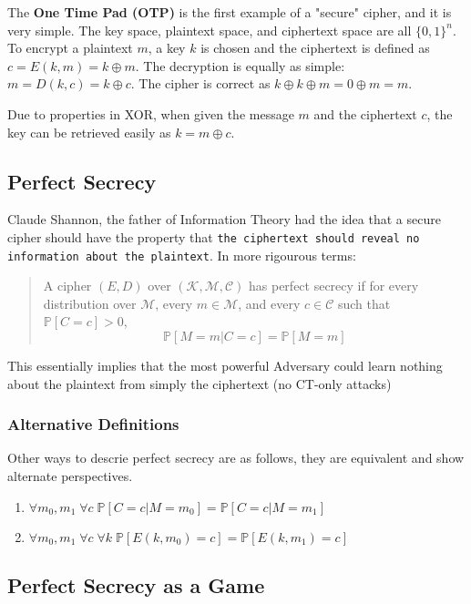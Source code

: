 \documentclass{article}
\begin{document}
\begin{multicols}{2}
The \textbf{One Time Pad (OTP)} is the first example of a "secure" cipher, and it is very simple. The key space, plaintext space, and ciphertext space are all $\{0,1\}^n$. To encrypt a plaintext $m$, a key $k$ is chosen and the ciphertext is defined as $c = E(k,m) = k \oplus m$. The decryption is equally as simple: $m = D(k,c) = k \oplus c$. The cipher is correct as $k \oplus k \oplus m = 0 \oplus m = m$.

Due to properties in XOR, when given the message $m$ and the ciphertext $c$, the key can be retrieved easily as $k = m \oplus c$.

\subsection{Perfect Secrecy}

Claude Shannon, the father of Information Theory had the idea that a secure cipher should have the property that \texttt{the ciphertext should reveal no information about the plaintext}. In more rigourous terms:
\begin{quote}
A cipher $(E,D)$ over $(\mathcal{K},\mathcal{M}, \mathcal{C})$ has perfect secrecy if for every distribution over $\mathcal{M}$, every $m \in \mathcal{M}$, and every $c \in \mathcal{C}$ such that $\mathbb{P}[C=c] >0$, 
$$
\mathbb{P}[M=m | C=c] = \mathbb{P}[M=m]
$$
\end{quote}

This essentially implies that the most powerful Adversary could learn nothing about the plaintext from simply the ciphertext (no CT-only attacks)

\subsubsection{Alternative Definitions}

Other ways to descrie perfect secrecy are as follows, they are equivalent and show alternate perspectives.

\begin{enumerate}
    \item $\forall m_0, m_1\;\forall c \; \mathbb{P}[C=c|M=m_0] = \mathbb{P}[C=c|M=m_1]$
    \item $\forall m_0, m_1\;\forall c \;\forall k\; \mathbb{P}[E(k,m_0) = c] = \mathbb{P}[E(k,m_1) = c]$
\end{enumerate}

\subsection{Perfect Secrecy as a Game}


\end{multicols}
\end{document}
